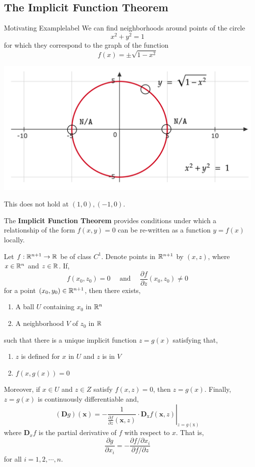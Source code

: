 \subsection{The Implicit Function Theorem}
\begin{ex}{Motivating Example}{label}
	We can find neighborhoods around points of the circle 
	\[x^2 + y^2 = 1\]
	for which they correspond to the graph of the function
	\[f(x) = \pm\sqrt{1-x^2}\]
	\begin{center}
    \includegraphics[width=0.7\linewidth]{figures/wk-6/fig-6.png}
	\end{center}
	This does not hold at $(1,0), (-1,0)$.
\end{ex}

\begin{marginfigure}
	The \textbf{Implicit Function Theorem} provides conditions under which a relationship of the form $f(x, y) = 0$ can be re-written as a function $y = f(x)$ locally.
\end{marginfigure}

\begin{thm}
	Let $f: \mathbb{R}^{n+1} \rightarrow \mathbb{R}$ be of class $C^1$. Denote points in $\mathbb{R}^{n+1}$ by $(x, z)$, where $x \in \mathbb{R}^n$ and $z \in \mathbb{R}$. If,
	\[f(x_0, z_0) = 0 \quad \text{ and } \quad \frac{\partial f}{\partial z} (x_0, z_0) \neq 0\]
	for a point $(x_0, y_0) \in \mathbb{R}^{n+1}$, then there exists,
	\begin{enumerate}
		\item A ball $U$ containing $x_0$ in $\mathbb{R}^n$ 
		\item A neighborhood $V$ of $z_0$ in $\mathbb{R}$
	\end{enumerate}
	 such that there is a unique implicit function $z = g(x)$ satisfying that,
	 \begin{enumerate}
	 	\item $z$ is defined for $x$ in $U$ and $z$ is in $V$
	 	\item $f(x, g(x)) = 0$ 
	 \end{enumerate}
	 Moreover, if $x \in U$ and $z \in Z$ satisfy $f(x, z) = 0$, then $z = g(x)$. Finally, $z = g(x)$ is continuously differentiable and,
	\[(\mathbf{D} g) (\mathbf{x})=-\left.\frac{1}{\frac{\partial f}{\partial z}(\mathbf{x}, z)} \cdot \mathbf{D}_{\mathrm{x}} f(\mathbf{x}, z)\right|_{z=g(\mathrm{x})}\]
	where $\mathbf{D}_x f$ is the partial derivative of $f$ with respect to $x$. That is,
	\[\frac{\partial g}{\partial x_i}=-\frac{\partial f / \partial x_i}{\partial f / \partial z}\]
	for all $i = 1, 2, \cdots, n$.
\end{thm}

